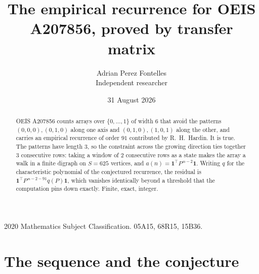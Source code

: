 \documentclass[11pt,a4paper]{article}
\title{The empirical recurrence for OEIS A207856, proved by transfer matrix}
\author{Adrian Perez Fontelles\\ \small Independent researcher}
\date{31 August 2026}
\theoremstyle{plain}
\theoremstyle{definition}
\begin{document}
\maketitle

\begin{abstract}
OEIS A207856 counts arrays over $\{0,\dots,1\}$ of width $6$ that avoid the patterns
$(0,0,0), (0,1,0)$ along one axis and $(0,1,0), (1,0,1)$ along the other, and carries an empirical recurrence of
order $91$ contributed by R.~H.~Hardin. It is true. The patterns have length $3$, so
the constraint across the growing direction ties together $3$ consecutive rows: taking a
window of $2$ consecutive rows as a state makes the array a walk in a finite digraph
on $S=625$ vertices, and $a(n)=\mathbf{1}^{\!\top}P^{\,n-2}\mathbf{1}$. Writing $q$
for the characteristic polynomial of the conjectured recurrence, the residual is
$\mathbf{1}^{\!\top}P^{\,n-2-91}q(P)\mathbf{1}$, which vanishes identically
beyond a threshold that the computation pins down exactly. Finite, exact, integer.
\end{abstract}

\noindent\small 2020 Mathematics Subject Classification. 05A15, 68R15, 15B36.\normalsize

\section{The sequence and the conjecture}
\end{document}
